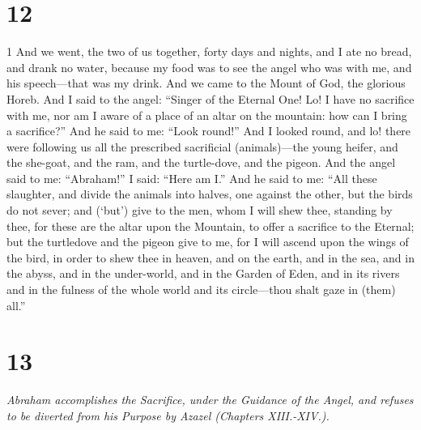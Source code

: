 \chapter{12}

\par 1 And we went, the two of us together, forty days and nights, and I ate no bread, and drank no water, because my food was to see the angel who was with me, and his speech—that was my drink. And we came to the Mount of God, the glorious Horeb. And I said to the angel: “Singer of the Eternal One! Lo! I have no sacrifice with me, nor am I aware of a place of an altar on the mountain: how can I bring a sacrifice?” And he said to me: “Look round!” And I looked round, and lo! there were following us all the prescribed sacrificial (animals)—the young heifer, and the she-goat, and the ram, and the turtle-dove, and the pigeon. And the angel said to me: “Abraham!” I said: “Here am I.” And he said to me: “All these slaughter, and divide the animals into halves, one against the other, but the birds do not sever; and (‘but’) give to the men, whom I will shew thee, standing by thee, for these are the altar upon the Mountain, to offer a sacrifice to the Eternal; but the turtledove and the pigeon give to me, for I will ascend upon the wings of the bird, in order to shew thee in heaven, and on the earth, and in the sea, and in the abyss, and in the under-world, and in the Garden of Eden, and in its rivers and in the fulness of the whole world and its circle—thou shalt gaze in (them) all.”

\chapter{13}

\par \textit{Abraham accomplishes the Sacrifice, under the Guidance of the Angel, and refuses to be diverted from his Purpose by Azazel (Chapters XIII.-XIV.).}

